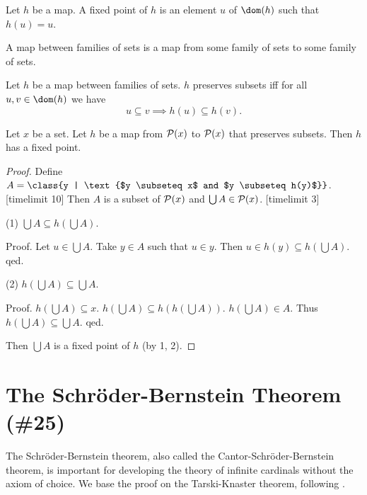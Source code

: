 \documentclass{article}
\newcommand{\pow}{{\cal P}}
\begin{document}
 \begin{forthel}
    \begin{definition}
      Let $h$ be a map.
      A fixed point of $h$ is an element $u$ of $\dom(h)$ such that $h(u) = u$.
    \end{definition}

    \begin{definition}
      A map between families of sets is a map from some family of
sets to some
      family of sets.
    \end{definition}

    \begin{definition*}
Let $h$ be a map between families of sets.
      $h$ preserves subsets iff for all $u, v \in \dom(h)$
      we have \[ u \subseteq v \implies h(u) \subseteq h(v). \]
    \end{definition*}


    \begin{theorem*}[title=Knaster-Tarski,id=KT]
      Let $x$ be a set.
      Let $h$ be a map from $\pow(x)$ to $\pow(x)$ that preserves subsets.
      Then $h$ has a fixed point.
    \end{theorem*}
    \begin{proof}
      Define $A = \class{y | \text{$y \subseteq x$ and
      $y \subseteq h(y)$}}$.
[timelimit 10]
      Then $A$ is a subset of $\pow(x)$ and
      $\bigcup A \in \pow(x)$.
[timelimit 3]

(1) $\bigcup A \subseteq h(\bigcup A)$.

Proof.        Let $u \in \bigcup A$.
        Take $y \in A$ such that $u \in y$.
        Then $u \in h(y) \subseteq h(\bigcup A)$.
      qed.

(2) $h(\bigcup A) \subseteq \bigcup A$.

Proof.      $h(\bigcup A) \subseteq x$.
$h(\bigcup A) \subseteq h(h(\bigcup A))$.
$h(\bigcup A) \in A$.
Thus $h(\bigcup A) \subseteq \bigcup A$.
qed.

Then $\bigcup A$ is a fixed point of $h$ (by 1, 2).
    \end{proof}

\end{forthel}

\section{The Schröder-Bernstein Theorem (\#25)}

The Schröder-Bernstein theorem, also called the
Cantor-Schröder-Bernstein theorem, is important for developing
the theory of infinite cardinals without the axiom of choice.
We base the proof on the Tarski-Knaster theorem, following
 \cite{Schroeder2012}.
\end{document}
